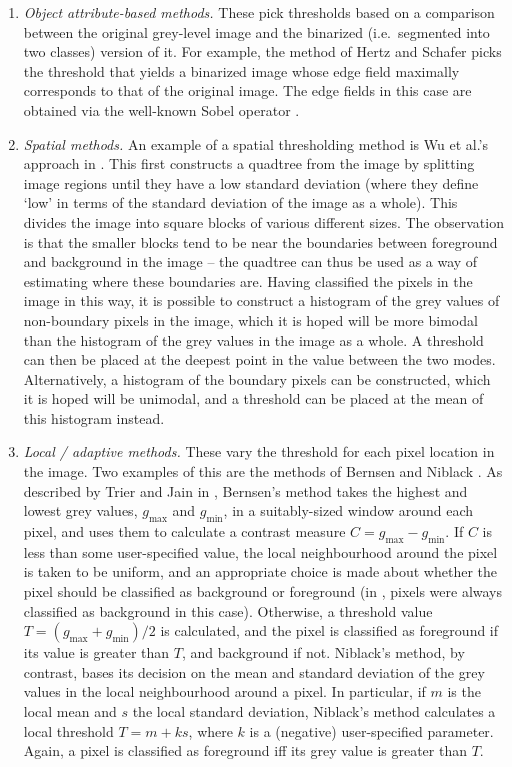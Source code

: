 \begin{enumerate}
\item \emph{Object attribute-based methods.} These pick thresholds based on a comparison between the original grey-level image and the binarized (i.e.~segmented into two classes) version of it. For example, the method of Hertz and Schafer \cite{hertz88} picks the threshold that yields a binarized image whose edge field maximally corresponds to that of the original image. The edge fields in this case are obtained via the well-known Sobel operator \cite{gonzalez02}.

\item \emph{Spatial methods.} An example of a spatial thresholding method is Wu et al.'s approach in \cite{wu82}. This first constructs a quadtree from the image by splitting image regions until they have a low standard deviation (where they define `low' in terms of the standard deviation of the image as a whole). This divides the image into square blocks of various different sizes. The observation is that the smaller blocks tend to be near the boundaries between foreground and background in the image -- the quadtree can thus be used as a way of estimating where these boundaries are. Having classified the pixels in the image in this way, it is possible to construct a histogram of the grey values of non-boundary pixels in the image, which it is hoped will be more bimodal than the histogram of the grey values in the image as a whole. A threshold can then be placed at the deepest point in the value between the two modes. Alternatively, a histogram of the boundary pixels can be constructed, which it is hoped will be unimodal, and a threshold can be placed at the mean of this histogram instead.

\item \emph{Local / adaptive methods.} These vary the threshold for each pixel location in the image. Two examples of this are the methods of Bernsen \cite{bernsen86} and Niblack \cite{niblack86}. As described by Trier and Jain in \cite{trier95}, Bernsen's method takes the highest and lowest grey values, $g_{\mbox{max}}$ and $g_{\mbox{min}}$, in a suitably-sized window around each pixel, and uses them to calculate a contrast measure $C = g_{\mbox{max}} - g_{\mbox{min}}$. If $C$ is less than some user-specified value, the local neighbourhood around the pixel is taken to be uniform, and an appropriate choice is made about whether the pixel should be classified as background or foreground (in \cite{trier95}, pixels were always classified as background in this case). Otherwise, a threshold value $T = (g_{\mbox{max}} + g_{\mbox{min}}) / 2$ is calculated, and the pixel is classified as foreground if its value is greater than $T$, and background if not. Niblack's method, by contrast, bases its decision on the mean and standard deviation of the grey values in the local neighbourhood around a pixel. In particular, if $m$ is the local mean and $s$ the local standard deviation, Niblack's method calculates a local threshold $T = m + ks$, where $k$ is a (negative) user-specified parameter. Again, a pixel is classified as foreground iff its grey value is greater than $T$.

\end{enumerate}

